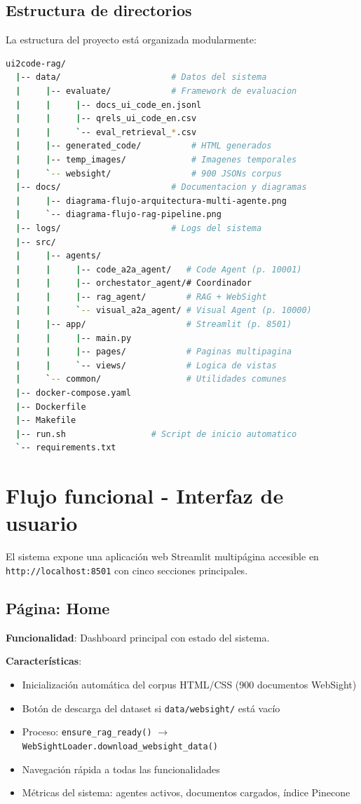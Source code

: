 \documentclass[12pt,a4paper]{article}
\begin{document}
\subsection{Estructura de directorios}

La estructura del proyecto está organizada modularmente:

\begin{lstlisting}[language=bash,caption={Estructura de Directorios Principal}]
ui2code-rag/
  |-- data/                      # Datos del sistema
  |     |-- evaluate/            # Framework de evaluacion
  |     |     |-- docs_ui_code_en.jsonl
  |     |     |-- qrels_ui_code_en.csv
  |     |     `-- eval_retrieval_*.csv
  |     |-- generated_code/          # HTML generados
  |     |-- temp_images/             # Imagenes temporales
  |     `-- websight/                # 900 JSONs corpus
  |-- docs/                      # Documentacion y diagramas
  |     |-- diagrama-flujo-arquitectura-multi-agente.png
  |     `-- diagrama-flujo-rag-pipeline.png
  |-- logs/                      # Logs del sistema
  |-- src/
  |     |-- agents/
  |     |     |-- code_a2a_agent/   # Code Agent (p. 10001)
  |     |     |-- orchestator_agent/# Coordinador
  |     |     |-- rag_agent/        # RAG + WebSight
  |     |     `-- visual_a2a_agent/ # Visual Agent (p. 10000)
  |     |-- app/                    # Streamlit (p. 8501)
  |     |     |-- main.py
  |     |     |-- pages/            # Paginas multipagina
  |     |     `-- views/            # Logica de vistas
  |     `-- common/                 # Utilidades comunes
  |-- docker-compose.yaml
  |-- Dockerfile
  |-- Makefile
  |-- run.sh                 # Script de inicio automatico
  `-- requirements.txt
\end{lstlisting}

\section{Flujo funcional - Interfaz de usuario}

El sistema expone una aplicación web Streamlit multipágina accesible en \texttt{http://localhost:8501} con cinco secciones principales.

\subsection{Página: Home}

\textbf{Funcionalidad}: Dashboard principal con estado del sistema.

\textbf{Características}:
\begin{itemize}
    \item Inicialización automática del corpus HTML/CSS (900 documentos WebSight)
    \item Botón de descarga del dataset si \texttt{data/websight/} está vacío
    \item Proceso: \texttt{ensure\_rag\_ready()} $\rightarrow$ \texttt{WebSightLoader.download\_websight\_data()}
    \item Navegación rápida a todas las funcionalidades
    \item Métricas del sistema: agentes activos, documentos cargados, índice Pinecone
\end{itemize}
\end{document}
